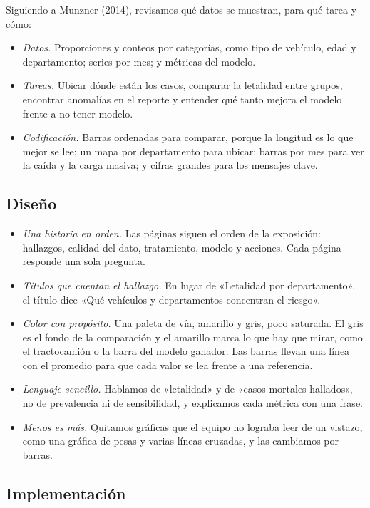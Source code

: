 \documentclass[11pt,a4paper]{article}
\begin{document}
Siguiendo a Munzner (2014), revisamos qué datos se muestran, para qué tarea y cómo:

\begin{itemize}
  \item \textit{Datos.} Proporciones y conteos por categorías, como tipo de vehículo, edad y departamento; series por mes; y métricas del modelo.
  \item \textit{Tareas.} Ubicar dónde están los casos, comparar la letalidad entre grupos, encontrar anomalías en el reporte y entender qué tanto mejora el modelo frente a no tener modelo.
  \item \textit{Codificación.} Barras ordenadas para comparar, porque la longitud es lo que mejor se lee; un mapa por departamento para ubicar; barras por mes para ver la caída y la carga masiva; y cifras grandes para los mensajes clave.
\end{itemize}

\subsection{Diseño}

\begin{itemize}
  \item \textit{Una historia en orden.} Las páginas siguen el orden de la exposición: hallazgos, calidad del dato, tratamiento, modelo y acciones. Cada página responde una sola pregunta.
  \item \textit{Títulos que cuentan el hallazgo.} En lugar de «Letalidad por departamento», el título dice «Qué vehículos y departamentos concentran el riesgo».
  \item \textit{Color con propósito.} Una paleta de vía, amarillo y gris, poco saturada. El gris es el fondo de la comparación y el amarillo marca lo que hay que mirar, como el tractocamión o la barra del modelo ganador. Las barras llevan una línea con el promedio para que cada valor se lea frente a una referencia.
  \item \textit{Lenguaje sencillo.} Hablamos de «letalidad» y de «casos mortales hallados», no de prevalencia ni de sensibilidad, y explicamos cada métrica con una frase.
  \item \textit{Menos es más.} Quitamos gráficas que el equipo no lograba leer de un vistazo, como una gráfica de pesas y varias líneas cruzadas, y las cambiamos por barras.
\end{itemize}

\subsection{Implementación}
\end{document}
